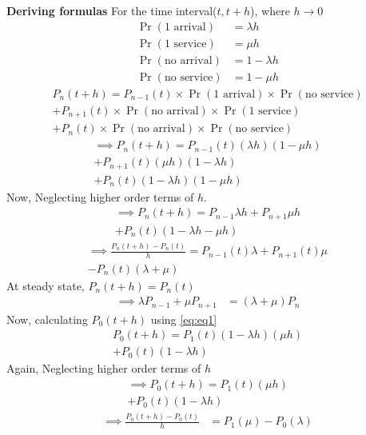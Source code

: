 \documentclass[journal,12pt,twocolumn]{IEEEtran}
\begin{document}
\newline \textbf{Deriving formulas}
\newline For the time interval($t,t+h$), where $h \to 0$
\begin{align}
    \Pr{(\text{1 arrival})}&=\lambda h\\
    \Pr{(\text{1 service})}&=\mu h\\
    \Pr{(\text{no arrival})}&=1-\lambda h\\
    \Pr{(\text{no service})}&=1-\mu h
\end{align}
\begin{multline}
    P_{n}(t+h)=P_{n-1}(t)\times\Pr{(\text{1 arrival})}\times\Pr{(\text{no service})}\\
    +P_{n+1}(t)\times\Pr{(\text{no arrival})}\times\Pr{(\text{1 service})}\\
    +P_n(t)\times\Pr{(\text{no arrival})}\times\Pr{(\text{no service})}\label{eq:eq1}
\end{multline}
\begin{multline}
    \implies P_{n}(t+h)=P_{n-1}(t)(\lambda h)(1-\mu h)\\
    +P_{n+1}(t)(\mu h)(1- \lambda h)\\
    +P_n(t)(1-\lambda h)(1-\mu h)
\end{multline}
Now, Neglecting higher order terms of $h$.
\begin{multline}
    \implies P_{n}(t+h)=P_{n-1}\lambda h+P_{n+1}\mu h\\
    +P_n(t)(1-\lambda h-\mu h)
\end{multline}
\begin{multline}
    \implies \frac{P_n(t+h)-P_n(t)}{h}=P_{n-1}(t)\lambda+P_{n+1}(t)\mu\\
    -P_n(t)(\lambda+\mu)
\end{multline}
At steady state, $P_n(t+h)=P_n(t)$
\begin{align}
    \implies\lambda P_{n-1}+\mu P_{n+1}&=(\lambda+\mu)P_n\label{eq:res1}
\end{align}
Now, calculating $P_0(t+h)$ using \eqref{eq:eq1}
\begin{multline}
    P_0(t+h)=P_1(t)(1-\lambda h)(\mu h)\\
    +P_0(t)(1-\lambda h)
\end{multline}
Again, Neglecting higher order terms of $h$
\begin{multline}
    \implies P_0(t+h)=P_1(t)(\mu h)\\
    +P_0(t)(1-\lambda h)
\end{multline}
\begin{align}
    \implies\frac{P_0(t+h)-P_0(t)}{h}&=P_1(\mu)-P_0(\lambda)
\end{align}
\end{document}
